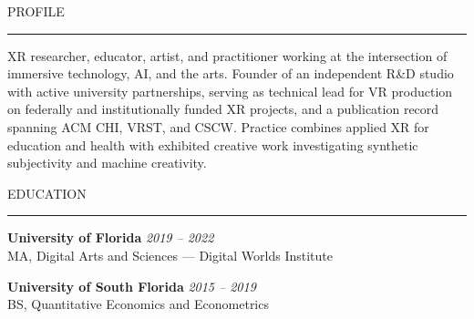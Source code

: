 \documentclass{resume} %
\renewenvironment{rSection}[1]{
  \needspace{4\baselineskip}
  \sectionskip
  \textcolor{CustomRed}{\MakeUppercase{#1}}
  \sectionlineskip
  \hrule
  \begin{list}{}{
    \setlength{\leftmargin}{1.5em}
  }
  \item[]
}{
  \end{list}
}
\begin{document}
\begin{rSection}{Profile}
XR researcher, educator, artist, and practitioner working at the intersection of immersive technology, AI, and the arts. Founder of an independent R\&D studio with active university partnerships, serving as technical lead for VR production on federally and institutionally funded XR projects, and a publication record spanning ACM CHI, VRST, and CSCW. Practice combines applied XR for education and health with exhibited creative work investigating synthetic subjectivity and machine creativity.
\end{rSection}

\begin{rSection}{Education}
\textbf{University of Florida} \hfill \emph{2019 -- 2022}\\
MA, Digital Arts and Sciences --- Digital Worlds Institute

\textbf{University of South Florida} \hfill \emph{2015 -- 2019}\\
BS, Quantitative Economics and Econometrics
\end{rSection}
\end{document}
